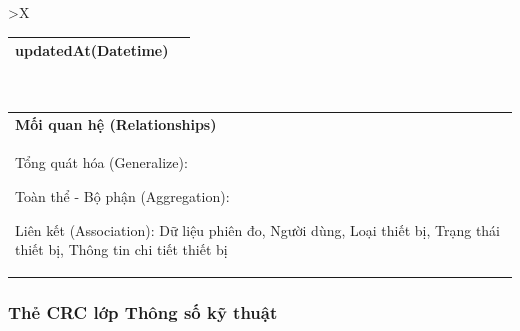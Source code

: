 \begin{xltabular}{\textwidth}{
		>{\centering\arraybackslash}X
	}
\begin{tabularx}{0.9\textwidth}{|X|X|}
		updatedAt(Datetime)
		\\ \hline
	\end{tabularx}
	\\
	\begin{tabularx}{0.9\textwidth}{|X|}
		\hline
		\textbf{Mối quan hệ (Relationships)} \\
		Tổng quát hóa (Generalize):

		Toàn thể - Bộ phận (Aggregation):

		Liên kết (Association): Dữ liệu phiên đo, Người dùng, Loại thiết bị, Trạng thái thiết bị, Thông tin chi tiết thiết bị
		\\
		\hline
	\end{tabularx}
\end{xltabular}

\subsubsection{Thẻ CRC lớp Thông số kỹ thuật}

